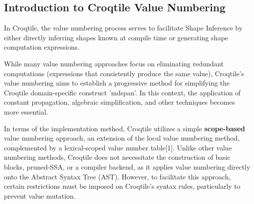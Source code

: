 \subsection*{Introduction to Croqtile Value Numbering}

In Croqtile, the value numbering process serves to facilitate Shape Inference by either directly inferring shapes known at compile time or generating shape computation expressions.

While many value numbering approaches focus on eliminating redundant computations (expressions that consistently produce the same value), Croqtile's value numbering aims to establish a progressive method for simplifying the Croqtile domain-specific construct 'mdspan'. In this context, the application of constant propagation, algebraic simplification, and other techniques becomes more essential.

In terms of the implementation method, Croqtile utilizes a simple \textbf{scope-based} value numbering approach, an extension of the local value numbering method, complemented by a lexical-scoped value number table[1]. Unlike other value numbering methods, Croqtile does not necessitate the construction of basic blocks, pruned-SSA, or a compiler backend, as it applies value numbering directly onto the Abstract Syntax Tree (AST). However, to facilitate this approach, certain restrictions must be imposed on Croqtile's syntax rules, particularly to prevent value mutation.

